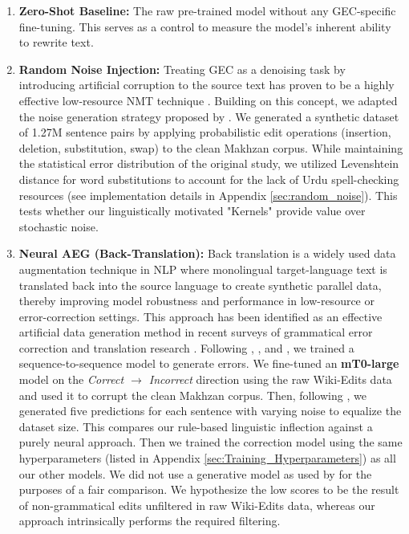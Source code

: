 \documentclass[11pt]{article}
\begin{document}
\begin{enumerate}
    \item \textbf{Zero-Shot Baseline:} The raw pre-trained model without any GEC-specific fine-tuning. This serves as a control to measure the model's inherent ability to rewrite text.
    \item \textbf{Random Noise Injection:} Treating GEC as a denoising task by introducing artificial corruption to the source text has proven to be a highly effective low-resource NMT technique \citep{junczys-dowmunt-etal-2018-approaching}. Building on this concept, we adapted the noise generation strategy proposed by \citet{grundkiewicz-etal-2019-neural}. We generated a synthetic dataset of 1.27M sentence pairs by applying probabilistic edit operations (insertion, deletion, substitution, swap) to the clean Makhzan corpus. While maintaining the statistical error distribution of the original study, we utilized Levenshtein distance for word substitutions to account for the lack of Urdu spell-checking resources (see implementation details in Appendix \ref{sec:random_noise}). This tests whether our linguistically motivated "Kernels" provide value over stochastic noise.
    \item \textbf{Neural AEG (Back-Translation):} Back translation is a widely used data augmentation technique in NLP where monolingual target-language text is translated back into the source language to create synthetic parallel data, thereby improving model robustness and performance in low-resource or error-correction settings. This approach has been identified as an effective artificial data generation method in recent surveys of grammatical error correction and translation research \citet{bryant-etal-2023-grammatical}. Following \citet{koyama-etal-2021-comparison}, \citet{rei-etal-2017-artificial}, and \citet{htut-tetreault-2019-unbearable}, we trained a sequence-to-sequence model to generate errors. We fine-tuned an \textbf{mT0-large} model on the \textit{Correct $\rightarrow$ Incorrect} direction using the raw Wiki-Edits data and used it to corrupt the clean Makhzan corpus. Then, following \citet{xie-etal-2018-noising}, we generated five predictions for each sentence with varying noise to equalize the dataset size. This compares our rule-based linguistic inflection against a purely neural approach. Then we trained the correction model using the same hyperparameters (listed in Appendix \ref{sec:Training_Hyperparameters}) as all our other models. We did not use a generative model as used by \citet{luhtaru-etal-2024-err} for the purposes of a fair comparison. We hypothesize the low scores to be the result of non-grammatical edits unfiltered in raw Wiki-Edits data, whereas our approach intrinsically performs the required filtering.
 

\end{enumerate}
\end{document}
